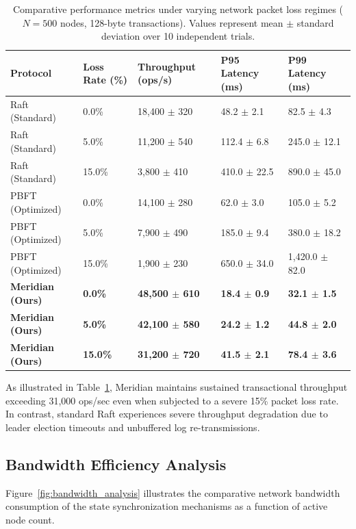 \documentclass[10pt,a4paper]{article}
\begin{document}
\begin{table}[htbp]
  \caption{Comparative performance metrics under varying network packet loss regimes ($N=500$ nodes, 128-byte transactions). Values represent mean $\pm$ standard deviation over 10 independent trials.}
  \label{tab:performance_results}
  \centering
  \small
  \begin{tabularx}{\textwidth}{p{2.6cm} p{2.2cm} X X X}
    \toprule
    \textbf{Protocol} & \textbf{Loss Rate (\%)} & \textbf{Throughput (ops/s)} & \textbf{P95 Latency (ms)} & \textbf{P99 Latency (ms)} \\
    \midrule
    Raft (Standard) & 0.0\% & 18,400 $\pm$ 320 & 48.2 $\pm$ 2.1 & 82.5 $\pm$ 4.3 \\
    Raft (Standard) & 5.0\% & 11,200 $\pm$ 540 & 112.4 $\pm$ 6.8 & 245.0 $\pm$ 12.1 \\
    Raft (Standard) & 15.0\% & 3,800 $\pm$ 410 & 410.0 $\pm$ 22.5 & 890.0 $\pm$ 45.0 \\
    \midrule
    PBFT (Optimized) & 0.0\% & 14,100 $\pm$ 280 & 62.0 $\pm$ 3.0 & 105.0 $\pm$ 5.2 \\
    PBFT (Optimized) & 5.0\% & 7,900 $\pm$ 490 & 185.0 $\pm$ 9.4 & 380.0 $\pm$ 18.2 \\
    PBFT (Optimized) & 15.0\% & 1,900 $\pm$ 230 & 650.0 $\pm$ 34.0 & 1,420.0 $\pm$ 82.0 \\
    \midrule
    \rowcolor{ACMHeaderBg}
    \textbf{Meridian (Ours)} & \textbf{0.0\%} & \textbf{48,500 $\pm$ 610} & \textbf{18.4 $\pm$ 0.9} & \textbf{32.1 $\pm$ 1.5} \\
    \rowcolor{ACMHeaderBg}
    \textbf{Meridian (Ours)} & \textbf{5.0\%} & \textbf{42,100 $\pm$ 580} & \textbf{24.2 $\pm$ 1.2} & \textbf{44.8 $\pm$ 2.0} \\
    \rowcolor{ACMHeaderBg}
    \textbf{Meridian (Ours)} & \textbf{15.0\%} & \textbf{31,200 $\pm$ 720} & \textbf{41.5 $\pm$ 2.1} & \textbf{78.4 $\pm$ 3.6} \\
    \bottomrule
  \end{tabularx}
\end{table}

As illustrated in Table~\ref{tab:performance_results}, Meridian maintains sustained transactional throughput exceeding 31,000 ops/sec even when subjected to a severe 15\% packet loss rate. In contrast, standard Raft experiences severe throughput degradation due to leader election timeouts and unbuffered log re-transmissions.

\subsection{Bandwidth Efficiency Analysis}
Figure~\ref{fig:bandwidth_analysis} illustrates the comparative network bandwidth consumption of the state synchronization mechanisms as a function of active node count.
\end{document}
